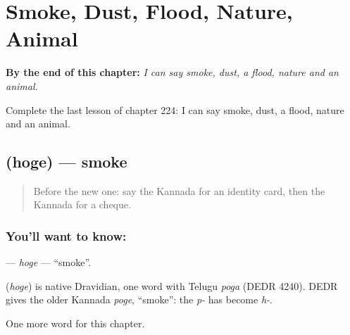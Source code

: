 
\chapter{Smoke, Dust, Flood, Nature, Animal}
\label{ch:ka-smoke-dust-flood-nature-animal}

\begin{chapteropening}
\textbf{By the end of this chapter:} \emph{I can say smoke, dust, a flood, nature and an animal.}

Complete the last lesson of chapter 224: I can say smoke, dust, a flood, nature and an animal.
\end{chapteropening}

\section[\texorpdfstring{\kn{ಹೊಗೆ} (hoge)}{ಹೊಗೆ (hoge)}]{ (hoge) — smoke}

\label{lesson:KA-C224-hoge}



\begin{quote}
Before the new one: say the Kannada for an identity card, then the Kannada for a cheque.
\end{quote}

\subsection*{You'll want to know: }
\textbf{} — \emph{hoge} — \textquotedblleft{}smoke\textquotedblright{}.

\begin{cousinweb}
\textbf{} (\emph{hoge}) is native Dravidian, one word with Telugu \emph{poga} (DEDR 4240). DEDR gives the older Kannada \emph{poge}, \textquotedblleft{}smoke\textquotedblright{}: the \emph{p-} has become \emph{h-}.
\end{cousinweb}

\begin{grammarlens}[title={What you've built}]
One more word for this chapter.
\end{grammarlens}

